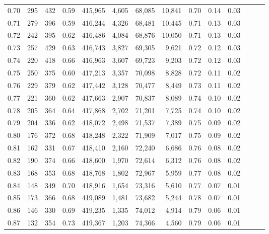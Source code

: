 \begin{tabular}{rrrrrrrrrrrrrr}
0.70 &     295 &    432 &  0.59 &  415,965 &    4,605 &  68,085 &  10,841 &  0.70 &  0.14 &      0.03 \\
0.71 &     279 &    396 &  0.59 &  416,244 &    4,326 &  68,481 &  10,445 &  0.71 &  0.13 &      0.03 \\
0.72 &     242 &    395 &  0.62 &  416,486 &    4,084 &  68,876 &  10,050 &  0.71 &  0.13 &      0.03 \\
0.73 &     257 &    429 &  0.63 &  416,743 &    3,827 &  69,305 &   9,621 &  0.72 &  0.12 &      0.03 \\
0.74 &     220 &    418 &  0.66 &  416,963 &    3,607 &  69,723 &   9,203 &  0.72 &  0.12 &      0.03 \\
0.75 &     250 &    375 &  0.60 &  417,213 &    3,357 &  70,098 &   8,828 &  0.72 &  0.11 &      0.02 \\
0.76 &     229 &    379 &  0.62 &  417,442 &    3,128 &  70,477 &   8,449 &  0.73 &  0.11 &      0.02 \\
0.77 &     221 &    360 &  0.62 &  417,663 &    2,907 &  70,837 &   8,089 &  0.74 &  0.10 &      0.02 \\
0.78 &     205 &    364 &  0.64 &  417,868 &    2,702 &  71,201 &   7,725 &  0.74 &  0.10 &      0.02 \\
0.79 &     204 &    336 &  0.62 &  418,072 &    2,498 &  71,537 &   7,389 &  0.75 &  0.09 &      0.02 \\
0.80 &     176 &    372 &  0.68 &  418,248 &    2,322 &  71,909 &   7,017 &  0.75 &  0.09 &      0.02 \\
0.81 &     162 &    331 &  0.67 &  418,410 &    2,160 &  72,240 &   6,686 &  0.76 &  0.08 &      0.02 \\
0.82 &     190 &    374 &  0.66 &  418,600 &    1,970 &  72,614 &   6,312 &  0.76 &  0.08 &      0.02 \\
0.83 &     168 &    353 &  0.68 &  418,768 &    1,802 &  72,967 &   5,959 &  0.77 &  0.08 &      0.02 \\
0.84 &     148 &    349 &  0.70 &  418,916 &    1,654 &  73,316 &   5,610 &  0.77 &  0.07 &      0.01 \\
0.85 &     173 &    366 &  0.68 &  419,089 &    1,481 &  73,682 &   5,244 &  0.78 &  0.07 &      0.01 \\
0.86 &     146 &    330 &  0.69 &  419,235 &    1,335 &  74,012 &   4,914 &  0.79 &  0.06 &      0.01 \\
0.87 &     132 &    354 &  0.73 &  419,367 &    1,203 &  74,366 &   4,560 &  0.79 &  0.06 &      0.01 \\

\end{tabular}
